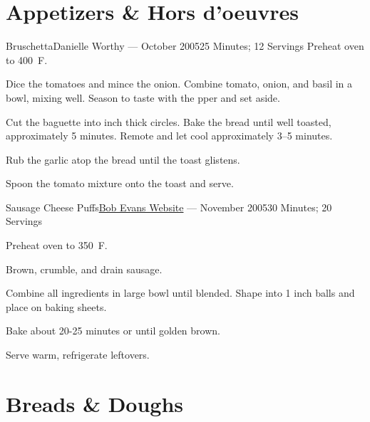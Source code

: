\documentclass{article}
\begin{document}
\renewcommand*{\recipetitlefont}{\large\bfseries}

\tableofcontents

\section{Appetizers \& Hors d'oeuvres}

\begin{recipe}{Bruschetta}{Danielle Worthy --- October 2005}{25 Minutes; 12 Servings}
   \newstep
   Preheat oven to 400\ \0F.

   Dice the tomatoes and mince the onion.  Combine tomato, onion, and basil in a
   bowl, mixing well.  Season to taste with the pper and set aside.

   Cut the baguette into  inch thick circles.  Bake the bread until well
   toasted, approximately 5 minutes.  Remote and let cool approximately 3--5
   minutes.

   Rub the garlic atop the bread until the toast glistens.

   \newstep
   Spoon the tomato mixture onto the toast and serve.

\end{recipe}

\begin{recipe}{Sausage Cheese Puffs}{\href{http://www.bobevans.com/Recipe/17/Sausage-Cheese-Puffs}{Bob Evans Website} --- November 2005}{30 Minutes; 20 Servings}

   \newstep
   Preheat oven to 350\ \0F.

   Brown, crumble, and drain sausage.

   Combine all ingredients in large bowl until blended.  Shape into 1 inch balls
   and place on baking sheets.

   \newstep
   Bake about 20-25 minutes or until golden brown.

   \freeform
   Serve warm, refrigerate leftovers.

\end{recipe}

\section{Breads \& Doughs}
\end{document}
